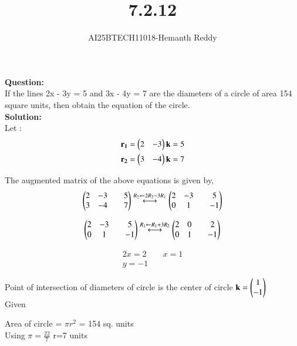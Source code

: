 \documentclass[journal]{IEEEtran}
\begin{document}

\vspace{3cm}

\title{7.2.12}
\author{AI25BTECH11018-Hemanth Reddy}
 \maketitle
{\let\newpage\relax\maketitle}

\renewcommand{\thefigure}{\theenumi}
\renewcommand{\thetable}{\theenumi}
\setlength{\intextsep}{10pt} %


\renewcommand{\thetable}{\theenumi}

\textbf{Question:}\\

If the lines 2x - 3y = 5 and 3x - 4y = 7 are the diameters of a circle of area 154
square units, then obtain the equation of the circle.\\
\textbf{Solution:}\\

Let :
\begin{align}
    \mathbf{r_1} = \begin{pmatrix}2 & -3 \end{pmatrix}\mathbf{k} = 5 \\
    \mathbf{r_2} = \begin{pmatrix}3 & -4\end{pmatrix}\mathbf{k} = 7
\end{align}

The augmented matrix of the above equations is given by,\\
\begin{align}
    \begin{pmatrix} 2&-3&&5\\ 3&-4&&7\end{pmatrix} \stackrel{R_2 \leftarrow 2R_2 - 3R_1}{\longleftrightarrow}\begin{pmatrix} 2&-3&&5\\ 0&1&&-1\end{pmatrix} 
\end{align}

\begin{align}
    \begin{pmatrix}2&-3&&5\\ 0&1&&-1\end{pmatrix} \stackrel{R_1 \leftarrow R_1 +3R_2}{\longleftrightarrow}\begin{pmatrix} 2&0&&2\\ 0&1&&-1\end{pmatrix} 
\end{align}

\begin{align}
    2x=2 \qquad x=1\\
    y=-1 
\end{align}

Point of intersection of diameters of circle is the center of circle $\mathbf{k}=\begin{pmatrix}1\\-1\end{pmatrix}$\\
Given\\
\begin{center}
    Area of circle = $\pi r^2$ = 154 sq. units\\Using $\pi=\frac{22}{7}$  \qquad r=7 units\\
\end{center}
\end{document}

